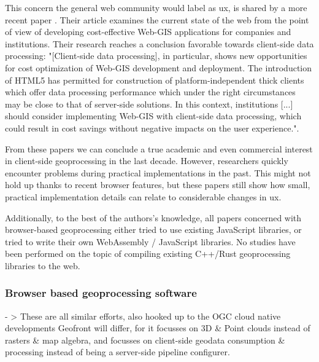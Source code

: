 This concern the general web community would label as \ac{ux}, is shared by a more recent paper \cite{kulawiak_analysis_2019}. 
Their article examines the current state of the web from the point of view of developing cost-effective Web-GIS applications for companies and institutions. 
Their research reaches a conclusion favorable towards client-side data processing: "[Client-side data processing], in particular, shows new opportunities for cost optimization of Web-GIS development and deployment. 
The introduction of HTML5 has permitted for construction of platform-independent thick clients which offer data processing performance which under the right circumstances may be close to that of server-side solutions. 
In this context, institutions [...] should consider implementing Web-GIS with client-side data processing, which could result in cost savings without negative impacts on the user experience.".


From these papers we can conclude a true academic and even commercial interest in client-side geoprocessing in the last decade. However, researchers quickly encounter problems during practical implementations in the past. This might not hold up thanks to recent browser features, but these papers still show how small, practical implementation details can relate to considerable changes in \ac{ux}. 

Additionally, to the best of the authors's knowledge, all papers concerned with browser-based geoprocessing either tried to use existing JavaScript libraries, or tried to write their own WebAssembly / JavaScript libraries. No studies have been performed on the topic of compiling existing C++/Rust geoprocessing libraries to the web. 




\subsubsection*{Browser based geoprocessing software}

- >
These are all similar efforts, also hooked up to the OGC cloud native developments
Geofront will differ, for it focusses on 3D \& Point clouds instead of rasters \& map algebra, and focusses on client-side geodata consumption \& processing instead of being a server-side pipeline configurer.

